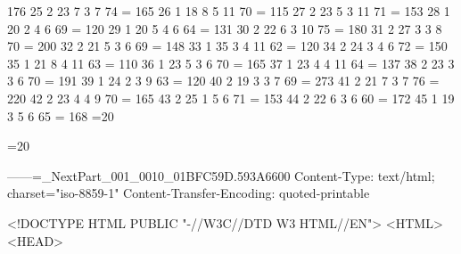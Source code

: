    176
     25         2         23          7          3     7       74        =
 165
     26        1        18          8         5       11         70      =
   115
     27         2         23          5          3       11         71   =
      153
     28        1        20          2         4      6        69         =
120
     29        1        20          5         4      6        64         =
131
     30         2         22          6          3      10         75    =
     180
     31         2         27          3          3      8        70      =
   200
     32         2         21          5          3      6        69      =
   148
     33        1        35          3         4       11         62      =
   120
     34         2         24          3         4      6        72       =
  150
     35        1        21          8         4       11         63      =
   110
     36        1        23          5          3      6        70        =
 165
     37        1        23          4         4       11         64      =
   137
     38         2         23          3          3      6        70      =
   191
     39        1        24          2          3      9        63        =
 120
     40         2         19          3          3     7       69        =
 273
     41         2         21          7          3     7       76        =
 220
     42         2         23          4         4      9        70       =
  165
     43         2         25          1         5      6        71       =
  153
     44         2         22          6          3      6        60      =
   172
     45        1        19          3         5      6        65         =
168
=20

=20


------=_NextPart_001_0010_01BFC59D.593A6600
Content-Type: text/html;
	charset="iso-8859-1"
Content-Transfer-Encoding: quoted-printable

<!DOCTYPE HTML PUBLIC "-//W3C//DTD W3 HTML//EN">
<HTML>
<HEAD>

